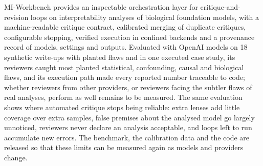 MI-Workbench provides an inspectable orchestration layer for critique-and-revision loops on interpretability analyses of biological foundation models, with a machine-readable critique contract, calibrated merging of duplicate critiques, configurable stopping, verified execution in confined backends and a provenance record of models, settings and outputs. Evaluated with OpenAI models on 18 synthetic write-ups with planted flaws and in one executed case study, its reviewers caught most planted statistical, confounding, causal and biological flaws, and its execution path made every reported number traceable to code; whether reviewers from other providers, or reviewers facing the subtler flaws of real analyses, perform as well remains to be measured. The same evaluation shows where automated critique stops being reliable: extra lenses add little coverage over extra samples, false premises about the analysed model go largely unnoticed, reviewers never declare an analysis acceptable, and loops left to run accumulate new errors. The benchmark, the calibration data and the code are released so that these limits can be measured again as models and providers change.
